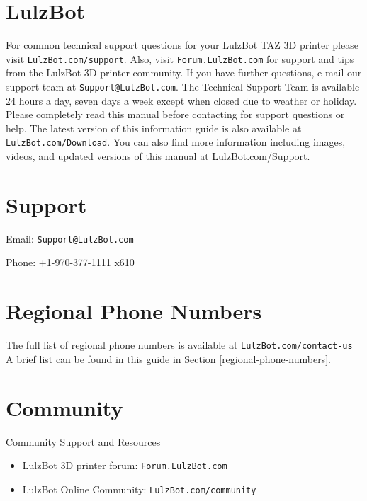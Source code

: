 %
%
%
%
%

\section{LulzBot}
\setlength{\parindent}{0pt}
For common technical support questions for your LulzBot TAZ 3D printer please visit \texttt{LulzBot.com/support}. Also, visit \texttt{Forum.LulzBot.com} for support and tips from the LulzBot 3D printer community. If you have further questions, e-mail our support team at \texttt{Support@LulzBot.com}. The Technical Support Team is available 24 hours a day, seven days a week except when closed due to weather or holiday. Please completely read this manual before contacting for support questions or help. The latest version of this information guide is also available at \texttt{LulzBot.com/Download}. You can also find more information including images, videos, and updated versions of this manual at LulzBot.com/Support.

\section{Support}
\setlength{\parindent}{0pt}
Email: \texttt{Support@LulzBot.com}

Phone: +1-970-377-1111 x610

\section{Regional Phone Numbers}
The full list of regional phone numbers is available at \texttt{LulzBot.com/contact-us} A brief list can be found in this guide in Section \ref{regional-phone-numbers}.

\section{Community}
Community Support and Resources

\begin{itemize}

\item LulzBot 3D printer forum: \texttt{Forum.LulzBot.com}
\item LulzBot Online Community: \texttt{LulzBot.com/community}

\end{itemize}
